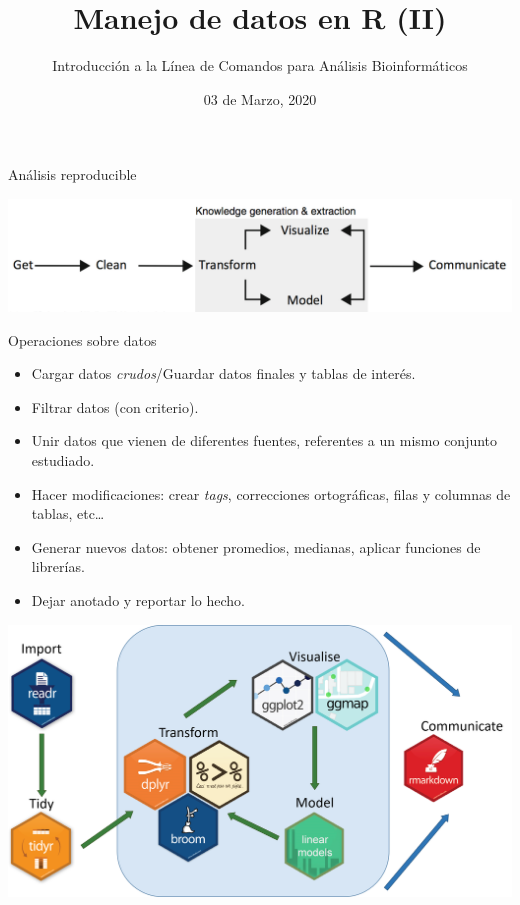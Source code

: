 \documentclass[ignorenonframetext,]{beamer}
\title{Manejo de datos en R (II)}
\author{Introducción a la Línea de Comandos para Análisis Bioinformáticos}
\date{03 de Marzo, 2020}
\providecommand{\tightlist}{%
  \setlength{\itemsep}{0pt}\setlength{\parskip}{0pt}}
\begin{document}
\frame{\titlepage}

\begin{frame}{Análisis reproducible}
\protect\hypertarget{anuxe1lisis-reproducible}{}

\includegraphics{analytic_process.png}

\end{frame}

\begin{frame}{Operaciones sobre datos}
\protect\hypertarget{operaciones-sobre-datos}{}

\begin{itemize}
\tightlist
\item
  Cargar datos \emph{crudos}/Guardar datos finales y tablas de interés.
\item
  Filtrar datos (con criterio).
\item
  Unir datos que vienen de diferentes fuentes, referentes a un mismo
  conjunto estudiado.
\item
  Hacer modificaciones: crear \emph{tags}, correcciones ortográficas,
  filas y columnas de tablas, etc\ldots{}
\item
  Generar nuevos datos: obtener promedios, medianas, aplicar funciones
  de librerías.
\item
  Dejar anotado y reportar lo hecho.
\end{itemize}

\end{frame}

\begin{frame}{}
\protect\hypertarget{section}{}


\includegraphics{tidyverse_packages.png}

\end{frame}
\end{document}
